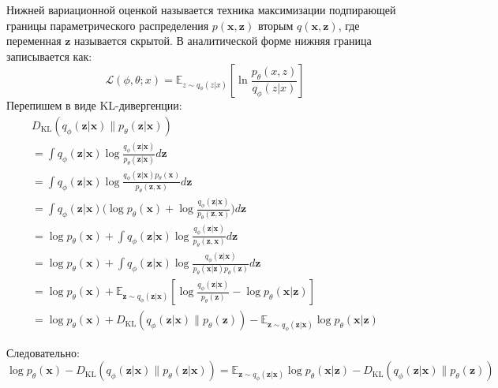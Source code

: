 Нижней вариационной оценкой называется техника максимизации подпирающей границы параметрического распределения $p(\mathbf{x},\mathbf{z})$ вторым $q(\mathbf{x},\mathbf{z})$,
где переменная $\mathbf{z}$ называется скрытой. В аналитической форме нижняя граница записывается как:
$$
    \mathcal{L}(\phi,\theta;x) = \mathbb{E}_{z \sim q_\phi(z|x)} \left[\ln \frac{p_{\theta}(x,z)}{q_{\phi}(z|x)}\right]
$$
Перепишем в виде KL-дивергенции:
\begin{equation}
    \begin{aligned}
        & D_\text{KL}( q_\phi(\mathbf{z}\vert\mathbf{x}) \| p_\theta(\mathbf{z}\vert\mathbf{x}) ) & \\
        &=\int q_\phi(\mathbf{z} \vert \mathbf{x}) \log\frac{q_\phi(\mathbf{z} \vert \mathbf{x})}{p_\theta(\mathbf{z} \vert \mathbf{x})} d\mathbf{z} & \\
        &=\int q_\phi(\mathbf{z} \vert \mathbf{x}) \log\frac{q_\phi(\mathbf{z} \vert \mathbf{x})p_\theta(\mathbf{x})}{p_\theta(\mathbf{z}, \mathbf{x})} d\mathbf{z}\\
        &=\int q_\phi(\mathbf{z} \vert \mathbf{x}) \big( \log p_\theta(\mathbf{x}) + \log\frac{q_\phi(\mathbf{z} \vert \mathbf{x})}{p_\theta(\mathbf{z}, \mathbf{x})} \big) d\mathbf{z} & \\
        &=\log p_\theta(\mathbf{x}) + \int q_\phi(\mathbf{z} \vert \mathbf{x})\log\frac{q_\phi(\mathbf{z} \vert \mathbf{x})}{p_\theta(\mathbf{z}, \mathbf{x})} d\mathbf{z} \\
        &=\log p_\theta(\mathbf{x}) + \int q_\phi(\mathbf{z} \vert \mathbf{x})\log\frac{q_\phi(\mathbf{z} \vert \mathbf{x})}{p_\theta(\mathbf{x}\vert\mathbf{z})p_\theta(\mathbf{z})} d\mathbf{z} \\
        &=\log p_\theta(\mathbf{x}) + \mathbb{E}_{\mathbf{z}\sim q_\phi(\mathbf{z} \vert \mathbf{x})}[\log \frac{q_\phi(\mathbf{z} \vert \mathbf{x})}{p_\theta(\mathbf{z})} - \log p_\theta(\mathbf{x} \vert \mathbf{z})] &\\
        &=\log p_\theta(\mathbf{x}) + D_\text{KL}(q_\phi(\mathbf{z}\vert\mathbf{x}) \| p_\theta(\mathbf{z})) - \mathbb{E}_{\mathbf{z}\sim q_\phi(\mathbf{z}\vert\mathbf{x})}\log p_\theta(\mathbf{x}\vert\mathbf{z}) &
    \end{aligned}
\end{equation}

Следовательно:
\begin{equation}
    \log p_\theta(\mathbf{x}) - D_\text{KL}( q_\phi(\mathbf{z}\vert\mathbf{x}) \| p_\theta(\mathbf{z}\vert\mathbf{x}) ) = \mathbb{E}_{\mathbf{z}\sim q_\phi(\mathbf{z}\vert\mathbf{x})}\log p_\theta(\mathbf{x}\vert\mathbf{z}) - D_\text{KL}(q_\phi(\mathbf{z}\vert\mathbf{x}) \| p_\theta(\mathbf{z}))
\end{equation}
    
